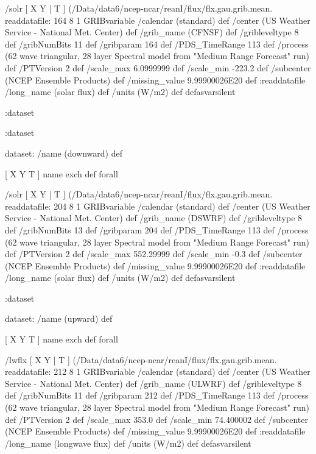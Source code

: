 \begin{ingrid}
    /solr { [ X Y | T ] (/Data/data6/ncep-ncar/reanI/flux/flx.gau.grib.mean.%
    readdatafile:
    164 8 1 GRIBvariable
    /calendar (standard) def
    /center (US Weather Service - National Met. Center) def
    /grib_name (CFNSF) def
    /gribleveltype 8 def
    /gribNumBits 11 def
    /gribparam 164 def
    /PDS_TimeRange 113 def
    /process (62 wave triangular, 28 layer Spectral model from "Medium Range Forecast" run) def
    /PTVersion 2 def
    /scale_max 6.0999999 def
    /scale_min -223.2 def
    /subcenter (NCEP Ensemble Products) def
    /missing_value 9.99900026E20 def
    :readdatafile
    /long_name (solar flux) def
    /units (W/m2) def
    } defasvarsilent

   :dataset

  :dataset

  dataset: /name (downward) def

   [ X Y T ] { name exch def } forall

   /solr { [ X Y | T ] (/Data/data6/ncep-ncar/reanI/flux/flx.gau.grib.mean.%
   readdatafile:
   204 8 1 GRIBvariable
   /calendar (standard) def
   /center (US Weather Service - National Met. Center) def
   /grib_name (DSWRF) def
   /gribleveltype 8 def
   /gribNumBits 13 def
   /gribparam 204 def
   /PDS_TimeRange 113 def
   /process (62 wave triangular, 28 layer Spectral model from "Medium Range Forecast" run) def
   /PTVersion 2 def
   /scale_max 552.29999 def
   /scale_min -0.3 def
   /subcenter (NCEP Ensemble Products) def
   /missing_value 9.99900026E20 def
   :readdatafile
   /long_name (solar flux) def
   /units (W/m2) def
   } defasvarsilent

  :dataset

  dataset: /name (upward) def

   [ X Y T ] { name exch def } forall

   /lwflx { [ X Y | T ] (/Data/data6/ncep-ncar/reanI/flux/flx.gau.grib.mean.%
   readdatafile:
   212 8 1 GRIBvariable
   /calendar (standard) def
   /center (US Weather Service - National Met. Center) def
   /grib_name (ULWRF) def
   /gribleveltype 8 def
   /gribNumBits 11 def
   /gribparam 212 def
   /PDS_TimeRange 113 def
   /process (62 wave triangular, 28 layer Spectral model from "Medium Range Forecast" run) def
   /PTVersion 2 def
   /scale_max 353.0 def
   /scale_min 74.400002 def
   /subcenter (NCEP Ensemble Products) def
   /missing_value 9.99900026E20 def
   :readdatafile
   /long_name (longwave flux) def
   /units (W/m2) def
   } defasvarsilent


\end{ingrid}
